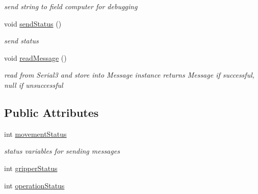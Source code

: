 \begin{DoxyCompactItemize}
\begin{DoxyCompactList}\small\item\em send string to field computer for debugging \end{DoxyCompactList}\item 
void \hyperlink{classBTClient_a8820e63eebe5ab16fac9b7cb522fc55a}{send\-Status} ()
\begin{DoxyCompactList}\small\item\em send status \end{DoxyCompactList}\item 
void \hyperlink{classBTClient_a8e827d16926d45a4b7c18dda0e59837b}{read\-Message} ()
\begin{DoxyCompactList}\small\item\em read from Serial3 and store into Message instance returns Message if successful, null if unsuccessful \end{DoxyCompactList}\end{DoxyCompactItemize}
\subsection*{Public Attributes}
\begin{DoxyCompactItemize}
\item 
int \hyperlink{classBTClient_aacff467239e0a6a85eab0ac77dbcfdf8}{movement\-Status}
\begin{DoxyCompactList}\small\item\em status variables for sending messages \end{DoxyCompactList}\item 
int \hyperlink{classBTClient_acdb5a8d964742a7236d2d0acc2e45585}{gripper\-Status}
\item 
int \hyperlink{classBTClient_a419405603d661e07e630a6649e9592a0}{operation\-Status}
\end{DoxyCompactItemize}
